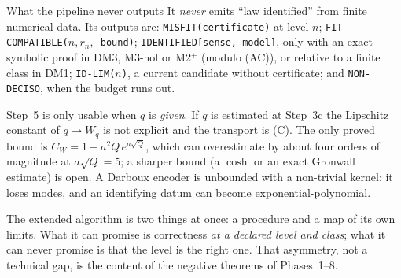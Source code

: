 \begin{aside}{What the pipeline never outputs}
It \emph{never} emits ``law identified'' from finite numerical data. Its outputs are: \texttt{MISFIT(certificate)} at level $n$; \texttt{FIT-COMPATIBLE($n,r_n,$ bound)}; \texttt{IDENTIFIED[sense, model]}, only with an exact symbolic proof in DM3, M3-hol or M2$^+$ (modulo (AC)), or relative to a finite class in DM1; \texttt{ID-LIM($n$)}, a current candidate without certificate; and \texttt{NON-DECISO}, when the budget runs out.
\end{aside}

\begin{caution}[title=The encoder is a translation]
Step~5 is only usable when $q$ is \emph{given}. If $q$ is estimated at Step~3c the Lipschitz constant of $q\mapsto W_q$ is not explicit and the transport is (C). The only proved bound is $C_W=1+a^2Q\,e^{a\sqrt Q}$, which can overestimate by about four orders of magnitude at $a\sqrt Q=5$; a sharper bound (a $\cosh$ or an exact Gronwall estimate) is open. A Darboux encoder is unbounded with a non-trivial kernel: it loses modes, and an identifying datum can become exponential-polynomial.
\end{caution}

\begin{takeaway}
The extended algorithm is two things at once: a procedure and a map of its own limits. What it can promise is correctness \emph{at a declared level and class}; what it can never promise is that the level is the right one. That asymmetry, not a technical gap, is the content of the negative theorems of Phases~1--8.
\end{takeaway}
